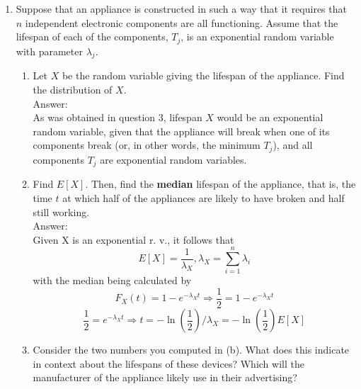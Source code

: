 \documentclass{article}
\begin{document}
\begin{enumerate}
\begin{align*}
            \end{align*}
            Then, assigning $\sum \lambda_{i} = \lambda_{M}$ gives a cdf of,
            $$ \fbox{$1 - e^{-m\lambda_{M}}$} $$
            with the pdf given by
            $$F'_M(m) = f_M(m) = 1 - e^{-m\lambda_M} \frac{d}{dm} =\fbox{$ \lambda_{M} e^{-m\lambda_{M}}$} $$
            resulting in M being an exponential random variable, given its cdf and pdf match the general forms of each.
    \clearpage
    \item   Suppose that an appliance is constructed in such a way that it requires that $n$ independent electronic 
            components are all functioning. Assume that the lifespan of each of the components, $T_j$, is an exponential 
            random variable with parameter $\lambda_j$.
        \begin{enumerate}
            \item   Let $X$ be the random variable giving the lifespan of the appliance. Find the distribution of $X$. 
                \\Answer:\\
                As was obtained in question 3, lifespan $X$ would be an exponential random variable, given that the appliance 
                will break when one of its components break (or, in other words, the minimum $T_j$), and all components 
                $T_j$ are exponential random variables. 
            \item   Find $E[X]$. Then, find the \textbf{median} lifespan of the appliance, that is, the time $t$ at 
                    which half of the appliances are likely to have broken and half still working.
                    \\Answer:\\
                    Given X is an exponential r. v., it follows that 
                    $$ E[X] = \frac{1}{\lambda_{X}}, \lambda_{X} = \sum_{i=1}^{n} \lambda_{i} $$
                    with the median being calculated by
                    $$ F_X(t) = 1 - e^{-\lambda_X t} \Rightarrow \frac{1}{2} = 1 - e^{-\lambda_X t} $$
                    $$ 
                        \frac{1}{2} = e^{-\lambda_X t} \Rightarrow t = -\ln\left(\frac{1}{2}\right)/\lambda_X = 
                        -\ln\left(\frac{1}{2}\right)E[X]
                    $$
            \item   Consider the two numbers you computed in (b). What does this indicate in context about the 
                    lifespans of these devices? Which will the manufacturer of the appliance likely use in their advertising?

\end{enumerate}
\end{enumerate}
\end{document}
